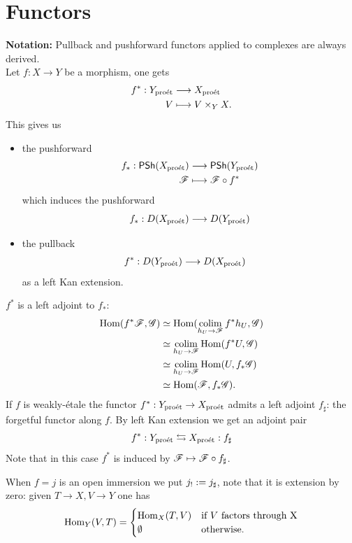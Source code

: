 \documentclass[oneside]{amsart}
\begin{document}
\section{Functors}
\textbf{Notation:} Pullback and pushforward functors applied to complexes are
always derived.\\
Let $f:X\to Y$ be a morphism, one gets
\begin{align*}
	f^{*}: Y_{\mathrm{pro\acute{e}t}} &\longrightarrow X_{\mathrm{pro\acute{e}t}} \\
	V &\longmapsto V\times_Y X.
\end{align*}
This gives us
\begin{itemize}
	\item the pushforward
		\begin{align*}
			f_*: \mathsf{PSh}(X_{\mathrm{pro\acute{e}t}}) &\longrightarrow \mathsf{PSh}(Y_{\mathrm{pro\acute{e}t}}) \\
			\mathscr{F} &\longmapsto \mathscr{F}\circ f^{*}
		\end{align*}
		which induces the pushforward
		\[
			f_*: D(X_{\mathrm{pro\acute{e}t}}) \longrightarrow D(Y_{\mathrm{pro\acute{e}t}}) \\
		\]

	\item the pullback
		\begin{align*}
			f^{*}: D(Y_{\mathrm{pro\acute{e}t}}) &\longrightarrow D(X_{\mathrm{pro\acute{e}t}})
		\end{align*}
		as a left Kan extension.
\end{itemize}
$f^{*}$ is a left adjoint to $f_*$:
\begin{align*}
	\Hom(f^{*}\CF,\CG) &\isoto \Hom(\colim_{h_U\to \CF}f^{*}h_U,\CG) \\
	&\isoto \colim_{h_U\to \CF}\Hom(f^{*}U,\CG) \\
	&\isoto \colim_{h_U\to \CF}\Hom(U,f_*\CG) \\
	&\isoto \Hom(\CF,f_*\CG).
\end{align*}
If $f$ is weakly-\'etale the functor $f^*:Y\proet\to X\proet$ admits a left adjoint
$f_\sharp$: the forgetful functor along $f$. By left Kan extension we get an adjoint pair
\[
	f^*:Y_{\mathrm{pro\acute{e}t}} \leftrightarrows X_{\mathrm{pro\acute{e}t}}:f_\sharp
\]
Note that in this case $f^{*}$ is induced by $\CF\mapsto \CF\circ f_\sharp$.

When $f=j$ is an open immersion we put $j_!:= j_\sharp$, note that it is extension by
zero: given $T\to X,V\to Y$ one has
\[
	\operatorname{Hom}_Y(V,T) =
	\begin{cases}
		\operatorname{Hom}_X(T,V) & \text{if }V\text{ factors through X} \\
		\emptyset & \text{otherwise}.
	\end{cases}
\]
\end{document}
